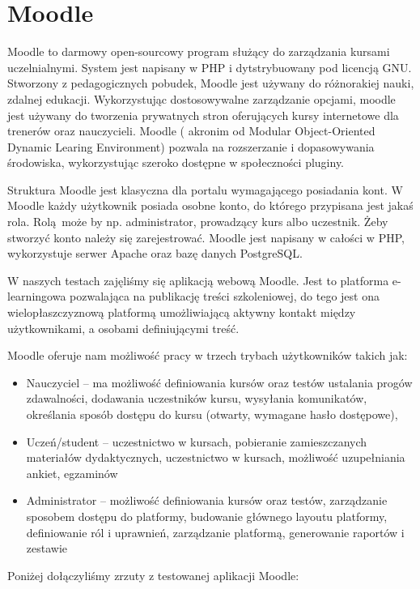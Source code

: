 \chapter{Moodle}
\label{cha:moodle}

Moodle to darmowy open-sourcowy program służący do zarządzania kursami uczelnialnymi. System jest napisany w PHP i dytstrybuowany pod licencją GNU. Stworzony z pedagogicznych pobudek, Moodle jest używany do różnorakiej nauki, zdalnej edukacji. Wykorzystując dostosowywalne zarządzanie opcjami, moodle jest używany do tworzenia prywatnych stron oferujących kursy internetowe dla trenerów oraz nauczycieli. Moodle ( akronim od Modular Object-Oriented Dynamic Learing Environment) pozwala na rozszerzanie i dopasowywania środowiska, wykorzystując szeroko dostępne w społeczności pluginy.

Struktura Moodle jest klasyczna dla portalu wymagającego posiadania kont. W Moodle każdy użytkownik posiada osobne konto, do którego przypisana jest jakaś rola. Rolą może by np. administrator, prowadzący kurs albo uczestnik. Żeby stworzyć konto należy się zarejestrować. Moodle jest napisany w całości w PHP, wykorzystuje serwer Apache oraz bazę danych PostgreSQL.

W naszych testach zajęliśmy się aplikacją webową Moodle. Jest to platforma e-learningowa pozwalająca na publikację treści szkoleniowej, do tego jest ona wielopłaszczyznową platformą umożliwiającą aktywny kontakt między użytkownikami, a osobami definiującymi treść.

Moodle oferuje nam możliwość pracy w trzech trybach użytkowników takich jak:
\begin{itemize}
\item Nauczyciel – ma możliwość definiowania kursów oraz testów ustalania progów zdawalności, dodawania uczestników kursu, wysyłania komunikatów, określania sposób dostępu do kursu (otwarty, wymagane hasło dostępowe),
\item Uczeń/student – uczestnictwo w kursach, pobieranie zamieszczanych materiałów dydaktycznych, uczestnictwo w kursach, możliwość uzupełniania ankiet, egzaminów
\item Administrator – możliwość definiowania kursów oraz testów, zarządzanie sposobem dostępu do platformy, budowanie głównego layoutu platformy, definiowanie ról i uprawnień, zarządzanie platformą, generowanie raportów i zestawie
\end{itemize}
Poniżej dołączyliśmy zrzuty z testowanej aplikacji Moodle:

